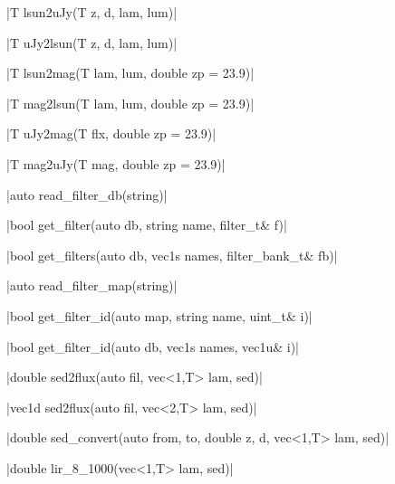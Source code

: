 \funcitem \cppinline|T lsun2uJy(T z, d, lam, lum)| 

\cppinline|T uJy2lsun(T z, d, lam, lum)| 

\funcitem \cppinline|T lsun2mag(T lam, lum, double zp = 23.9)| 

\cppinline|T mag2lsun(T lam, lum, double zp = 23.9)| 

\funcitem \cppinline|T uJy2mag(T flx, double zp = 23.9)| 

\cppinline|T mag2uJy(T mag, double zp = 23.9)| 

\funcitem \cppinline|auto read_filter_db(string)| 

\funcitem \cppinline|bool get_filter(auto db, string name, filter_t& f)| 

\cppinline|bool get_filters(auto db, vec1s names, filter_bank_t& fb)| 

\funcitem \cppinline|auto read_filter_map(string)| 

\funcitem \cppinline|bool get_filter_id(auto map, string name, uint_t& i)| 

\cppinline|bool get_filter_id(auto db, vec1s names, vec1u& i)|

\funcitem \cppinline|double sed2flux(auto fil, vec<1,T> lam, sed)| 

\cppinline|vec1d sed2flux(auto fil, vec<2,T> lam, sed)|

\funcitem \cppinline|double sed_convert(auto from, to, double z, d, vec<1,T> lam, sed)| 

\funcitem \cppinline|double lir_8_1000(vec<1,T> lam, sed)| 
